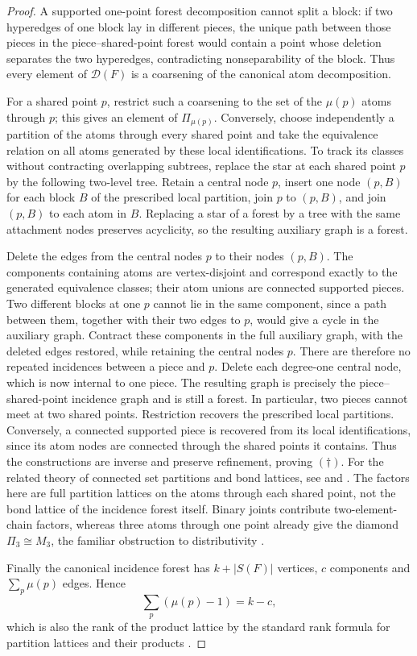 \documentclass[a4paper,11pt,reqno]{amsart}
\theoremstyle{plain}
\theoremstyle{definition}
\theoremstyle{remark}
\begin{document}
\begin{proof}
A supported one-point forest decomposition cannot split a block: if two
hyperedges of one block lay in different pieces, the unique path between
those pieces in the piece--shared-point forest would contain a point whose
deletion separates the two hyperedges, contradicting nonseparability of the
block.  Thus every element of $\mathcal D(F)$ is a coarsening of the canonical
atom decomposition.

For a shared point $p$, restrict such a coarsening to the set of the
$\mu(p)$ atoms through $p$; this gives an element of $\Pi_{\mu(p)}$.
Conversely, choose independently a partition of the atoms through every
shared point and take the equivalence relation on all atoms generated by
these local identifications.  To track its classes without contracting
overlapping subtrees, replace the star at each shared point $p$ by the
following two-level tree.  Retain a central node $p$, insert one node $(p,B)$
for each block $B$ of the prescribed local partition, join $p$ to $(p,B)$,
and join $(p,B)$ to each atom in $B$.  Replacing a star of a forest by a tree
with the same attachment nodes preserves acyclicity, so the resulting
auxiliary graph is a forest.

Delete the edges from the central nodes $p$ to their nodes $(p,B)$.  The
components containing atoms are vertex-disjoint and correspond
exactly to the generated equivalence classes; their atom unions are
connected supported pieces.  Two different blocks at one $p$ cannot lie in
the same component, since a path between them, together with their two edges
to $p$, would give a cycle in the auxiliary graph.  Contract these
components in the full auxiliary graph, with the deleted edges restored,
while retaining the central nodes $p$.  There are
therefore no repeated incidences between a piece and $p$.  Delete each
degree-one central node, which is now internal to one piece.  The resulting
graph is precisely the piece--shared-point incidence graph and is still a
forest.  In particular, two pieces cannot meet at two shared points.
Restriction recovers the prescribed local partitions.  Conversely, a
connected supported piece is recovered from its local identifications,
since its atom nodes are connected through the shared points it contains.
Thus the constructions are inverse and preserve refinement, proving
\((\dagger)\).  For the related theory of connected set partitions and bond
lattices, see \citet{simon2011} and \citet[Lecture~2]{stanley2007}.
The factors here are full partition lattices on the atoms through each
shared point, not the bond lattice of the incidence forest itself.
Binary joints contribute two-element-chain factors, whereas three atoms
through one point already give the diamond $\Pi_3\cong M_3$, the familiar
obstruction to distributivity \citep[Chapter~II, Theorem~101]{gratzer2011}.

Finally the canonical incidence forest has $k+|S(F)|$ vertices, $c$
components and $\sum_p\mu(p)$ edges.  Hence
\[
 \sum_p(\mu(p)-1)=k-c,
\]
which is also the rank of the product lattice by the standard rank formula
for partition lattices and their products \citep[Chapter~3]{stanley2012}.
\end{proof}
\end{document}
